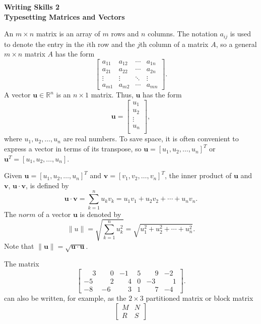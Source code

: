 \documentclass[12pt]{article}
\begin{document}
\begin{center}
\textbf{Writing Skills 2\\
Typesetting Matrices and Vectors}
\end{center}

An $m \times n$ matrix is an array of $m$ rows and $n$ columns. The notation $a_{ij}$ 
is used to denote the entry in the $i$th row and the $j$th column of a matrix $A$, so a general $m \times n$ matrix $A$ has the form 
       $$ \begin{bmatrix}
            a_{11} & a_{12} & \cdots & a_{1n} \\
            a_{21} & a_{22} & \cdots & a_{2n} \\
            \vdots  & \vdots  & \ddots & \vdots  \\
            a_{m1} & a_{m2} & \cdots & a_{mn} 
        \end{bmatrix}    .$$
A vector $ \mathbf{u} \in \mathbb{R}^n$ is an $n \times 1$ matrix. Thus, $\mathbf{u}$ has the form $$ \mathbf{u} = \begin{bmatrix}
    u_1\\u_2\\\vdots\\u_n\\
\end{bmatrix},$$
where $u_1,u_2, \ldots , u_n$ are real numbers. To save space, it is often convenient to express a vector in terms of its transpose, so $\mathbf{u} = [u_1,u_2,\ldots,u_n]^T$ or $ \mathbf{u}^T = [u_1,u_2,\ldots,u_n]$.

Given $\mathbf{u} = [u_1,u_2,\ldots,u_n]^T$ and $\mathbf{v} = [v_1,v_2,\ldots,v_n]^T$, the inner product of $\mathbf{u}$ and $\mathbf{v}$, $\mathbf{u} \cdot \mathbf{v}$, is defined by 
\[ \mathbf{u} \cdot \mathbf{v} = \sum_{k=1}^{n} u_k v_k = u_1v_1 + u_2v_2 + \cdots + u_n v_n .\]
The $norm$ of  a vector $\mathbf{u}$ is denoted by \[ \|u\| = \sqrt{ \sum_{k=1}^{n} u_k^2} = \sqrt{u_1^2+u_2^2+\cdots + u_n^2} .\]
Note that $\|\mathbf{u}\| = \sqrt{\mathbf{u} \cdot \mathbf{u}}.$

The matrix $$ \begin{bmatrix}
    \phantom{-}3 & \phantom{-}0 & -1 & 5 & \phantom{-}9 & -2\\
    -5 & \phantom{-}2 & \phantom{-}4 & 0 & -3 & \phantom{-}1 \\
    -8 & -6 & \phantom{-}3 & 1 & \phantom{-}7 & -4  
     
\end{bmatrix}    .$$
can also be written, for example, as the $2 \times 3$ partitioned matrix or block matrix
$$ \left[
    \begin{array}{c|c}
    M & N \\
    \hline
    R & S
    \end{array}
    \right]
     $$
\end{document}
